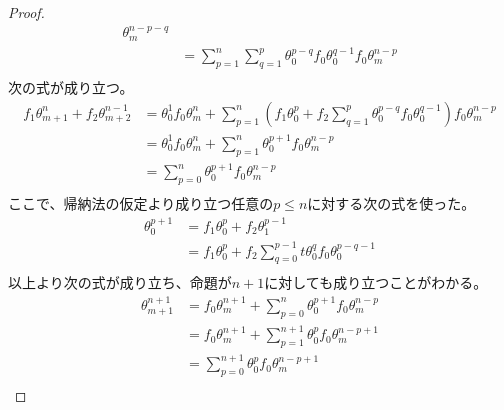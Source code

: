 \begin{proof}
\begin{equation*}
\begin{split}
				\theta_m^{n-p-q} \\
			&= \sum_{p=1}^n\sum_{q=1}^p\theta_0^{p-q}f_0\theta_0^{q-1}f_0
				\theta_m^{n-p} \\
		\end{split}\end{equation*} %
		次の式が成り立つ。
		\begin{equation*}\begin{split} %
			f_1\theta_{m+1}^n + f_2\theta_{m+2}^{n-1}
			&= \theta_0^1f_0\theta_m^n 
				+ \sum_{p=1}^n(
					f_1\theta_0^p + f_2\sum_{q=1}^p\theta_0^{p-q}f_0\theta_0^{q-1}
				)f_0\theta_m^{n-p} \\
			&= \theta_0^1f_0\theta_m^n  
				+ \sum_{p=1}^n\theta_0^{p+1}f_0\theta_m^{n-p} \\
			&= \sum_{p=0}^n\theta_0^{p+1}f_0\theta_m^{n-p} \\
		\end{split}\end{equation*} %
		ここで、帰納法の仮定より成り立つ任意の$p\le n$に対する次の式を使った。
		\begin{equation*}\begin{split} %
			\theta_0^{p+1} &= f_1\theta_0^p + f_2\theta_1^{p-1} \\
			&= f_1\theta_0^p 
				+ f_2\sum_{q=0}^{p-1}t\theta_0^qf_0\theta_0^{p-q-1} \\
		\end{split}\end{equation*} %
		以上より次の式が成り立ち、命題が$n+1$に対しても成り立つことがわかる。
		\begin{equation*}\begin{split} %
			\theta_{m+1}^{n+1}
			&= f_0\theta_m^{n+1} + \sum_{p=0}^n\theta_0^{p+1}f_0\theta_m^{n-p} \\
			&= f_0\theta_m^{n+1} 
				+ \sum_{p=1}^{n+1}\theta_0^pf_0\theta_m^{n-p+1} \\
			&= \sum_{p=0}^{n+1}\theta_0^pf_0\theta_m^{n-p+1} \\
		\end{split}\end{equation*} %
	\end{proof} %

